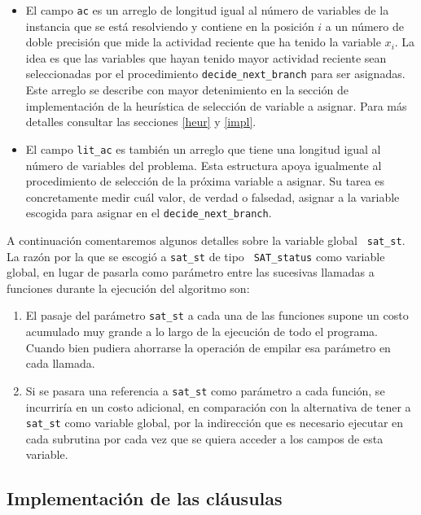 \documentclass[12pt,lettersize,oneside]{article}
\begin{document}
\begin{itemize}
\item El campo {\tt ac} es un arreglo de longitud igual al número de variables
  de la instancia que se está resolviendo y contiene en la posición $i$ a un
  número de doble precisión que mide la actividad reciente que ha tenido la
  variable $x_i$. La idea es que las variables que hayan tenido mayor actividad
  reciente sean seleccionadas por el procedimiento {\tt decide\_next\_branch}
  para ser asignadas. Este arreglo se describe con mayor detenimiento en la
  sección de implementación de la heurística de selección de variable a asignar.
  Para más detalles consultar las secciones \ref{heur} y \ref{impl}.

\item El campo {\tt lit\_ac} es también un arreglo que tiene una longitud igual
  al número de variables del problema. Esta estructura apoya igualmente al
  procedimiento de selección de la próxima variable a asignar. Su tarea es
  concretamente medir cuál valor, de verdad o falsedad, asignar a la variable
  escogida para asignar en el {\tt decide\_next\_branch}.
\end{itemize}\vspace{-2.5mm}

A continuación comentaremos algunos detalles sobre la variable global {\tt
  sat\_st}. La razón por la que se escogió a {\tt sat\_st} de tipo {\tt
  SAT\_status} como variable global, en lugar de pasarla como parámetro entre
las sucesivas llamadas a funciones durante la ejecución del algoritmo son:
\begin{enumerate}
\item El pasaje del parámetro {\tt sat\_st} a cada una de las funciones supone
  un costo acumulado muy grande a lo largo de la ejecución de todo el
  programa. Cuando bien pudiera ahorrarse la operación de empilar esa parámetro
  en cada llamada.
\item Si se pasara una referencia a {\tt sat\_st} como parámetro a cada función,
  se incurriría en un costo adicional, en comparación con la alternativa de
  tener a {\tt sat\_st} como variable global, por la indirección que es
  necesario ejecutar en cada subrutina por cada vez que se quiera acceder a los
  campos de esta variable.
\end{enumerate}

\subsection{Implementación de las cláusulas}\label{clausulas}
\end{document}
